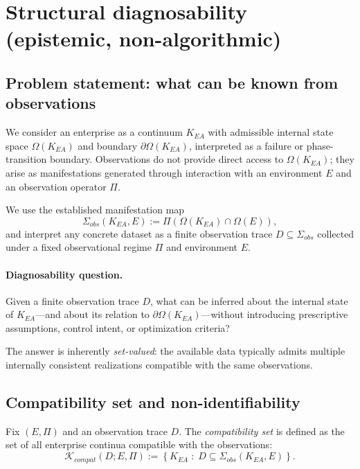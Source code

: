 ﻿\section{Structural diagnosability (epistemic, non-algorithmic)}
\label{sec:pdf2_structural_diagnosability}

\subsection{Problem statement: what can be known from observations}
We consider an enterprise as a continuum $K_{EA}$ with admissible internal state
space $\Omega(K_{EA})$ and boundary $\partial\Omega(K_{EA})$, interpreted as a
failure or phase-transition boundary.
Observations do not provide direct access to $\Omega(K_{EA})$; they arise as
manifestations generated through interaction with an environment $E$ and an
observation operator $\Pi$.

We use the established manifestation map
\[
\Sigma_{obs}(K_{EA},E) := \Pi\!\left(\Omega(K_{EA}) \cap \Omega(E)\right),
\]
and interpret any concrete dataset as a finite observation trace
$D \subseteq \Sigma_{obs}$ collected under a fixed observational regime $\Pi$
and environment $E$.

\paragraph{Diagnosability question.}
Given a finite observation trace $D$, what can be inferred about the internal
state of $K_{EA}$—and about its relation to $\partial\Omega(K_{EA})$—without
introducing prescriptive assumptions, control intent, or optimization criteria?

The answer is inherently \emph{set-valued}: the available data typically admits
multiple internally consistent realizations compatible with the same observations.

\subsection{Compatibility set and non-identifiability}
\label{sec:pdf2_compatibility_set}

\begin{definition}
\label{def:compatibility_set}
Fix $(E,\Pi)$ and an observation trace $D$.
The \emph{compatibility set} is defined as the set of all enterprise continua
compatible with the observations:
\[
\mathcal{K}_{compat}(D;E,\Pi) :=
\left\{K_{EA} \;:\; D \subseteq \Sigma_{obs}(K_{EA},E)\right\}.
\]
\end{definition}

